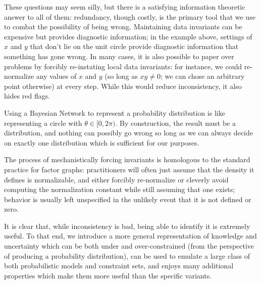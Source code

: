 \documentclass{article}
\newcommand{\modelnames}{Probabilistic Dependency Graphs}
\begin{document}
	These questions may seem silly, but there is a satisfying information theoretic answer to all of them: redundancy, though costly, is the primary tool that we use to combat the possibility of being wrong. Maintaining data invariants can be expensive but provides diagnostic information; in the example above, settings of $x$ and $y$ that don't lie on the unit circle provide diagnostic information that something has gone wrong.
	In many cases, it is also possible to paper over problems by forcibly re-instating local data invariants: for instance, we could re-normalize any values of $x$ and $y$ (so long as $xy \neq 0$; we can chose an arbitrary point otherwise) at every step. While this would reduce inconsistency, it also hides red flags.

	Using a Bayesian Network to represent a probability distribution is like representing a circle with $\theta \in [0, 2\pi)$. 
	By construction, the result must be a distribution, and nothing can possibly go wrong so long as we can always decide on exactly one distribution which is sufficient for our purposes.
	
	
	The process of mechanistically forcing invariants is homologous to the standard practice for factor graphs: practitioners will often just assume that the density it defines is normalizable, and either forcibly re-normalize or cleverly avoid computing the normalization constant while still assuming that one exists; behavior is usually left unspecified in the unlikely event that it is not defined or zero.

	It is clear that, while inconsistency is bad, being able to identify it is extremely useful. To that end, we introduce a more general representation of knowledge and uncertainty which can be both under and over-constrained (from the perspective of producing a probability distribution), can be used to emulate a large class of both probabilistic models and constraint sets, and enjoys many additional properties which make them more useful than the specific variants. %
\end{document}
